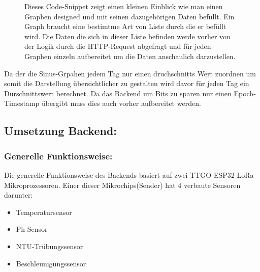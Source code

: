 \begin{figure}[h!]
\begin{minipage}[c]{0.5\textwidth}
\end{minipage}
\begin{minipage}[c]{0.5\textwidth}
    \label{fig:CodeSnippetGraph}
    Dieses Code-Snippet zeigt einen kleinen Einblick wie man einen Graphen designed und mit seinen dazugehörigen 
    Daten befüllt. Ein Graph braucht eine bestimtme Art von Liste durch die er befüllt wird. Die Daten 
    die sich in dieser Liste befinden werde vorher von der Logik durch die HTTP-Request abgefragt und für jeden Graphen einzeln
    aufbereitet um die Daten anschaulich darzustellen.
\end{minipage}
\end{figure}
\newline 
Da der die Sinus-Grpahen jedem Tag nur einen druchschnitts Wert zuordnen um somit die Darstellung übersichtlicher
zu gestalten wird davor für jeden Tag ein Durschnittswert berechnet. Da das Backend um Bits zu sparen nur einen Epoch-Timestamp übergibt
muss dies auch vorher aufbereitet werden.


\newpage
\subsection*{Umsetzung Backend:}
\subsubsection*{Generelle Funktionsweise:}
Die generelle Funktionsweise des Backends basiert auf zwei TTGO-ESP32-LoRa  \newline Mikroprozessoren. 
Einer dieser Mikrochips(Sender) hat 4 verbaute Sensoren darunter:

\begin{itemize}
  \item Temperatursensor
  \item Ph-Sensor
  \item NTU-Trübungssensor
  \item Beschleunigungssensor  
\end{itemize}


